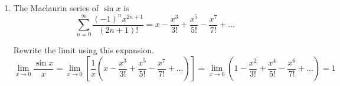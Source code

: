 \documentclass[a4paper, 12pt]{article}
\renewcommand{\headrulewidth}{0pt}
\renewcommand{\headrulewidth}{0pt}
\begin{document}
\begin{enumerate}[leftmargin=*,label=\textbf{\arabic*.}]
Now, take a look at the endpoints.
\[x=-2\rightarrow\sum_{k=1}^{\infty}\frac{(-1)^k}{2k}=\frac12\sum_{k=1}^{\infty}\frac{(-1)^k}k\]

This is an alternating series. The non-alternating part, which is $\frac1k$, is nonincreasing for $k\geq1$ and it is positive. The limit at infinity is $0$. By Leibniz's Alternating Series Test, the series converges. Try $x=0$.
\[x=0\rightarrow\sum_{k=1}^{\infty}\frac{1^k}{2k}=\frac12\sum_{k=1}^{\infty}\frac1k\]

This is a $p$-series with $p=1$, for which the series diverges by the $p$-series Test.

The convergence set for the power series is
\[\boxed{[-2, 0)}\]

\item The Maclaurin series of $\sin x$ is
\[\sum_{n=0}^{\infty}\frac{(-1)^nx^{2n+1}}{(2n+1)!}=x-\frac{x^3}{3!}+\frac{x^5}{5!}-\frac{x^7}{7!}+...\]

Rewrite the limit using this expansion.
\[\lim_{x\to0}\frac{\sin x}{x}=\lim_{x\to0}\left[\frac1x\left(x-\frac{x^3}{3!}+\frac{x^5}{5!}-\frac{x^7}{7!}+...\right)\right]=\lim_{x\to0}\left(1-\frac{x^2}{3!}+\frac{x^4}{5!}-\frac{x^6}{7!}+...\right)=\boxed{1}\]

\end{enumerate}

\newpage
{}
{}

\newpage
\pagestyle{fancy}
\renewcommand{\headrulewidth}{1pt}

\end{document}
